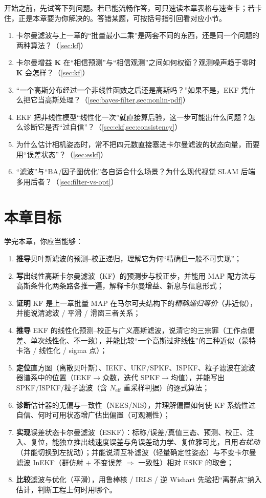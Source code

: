 \begin{practice}[前置自测]
开始之前，先试答下列问题。若已能流畅作答，可只速读本章表格与速查卡；若卡住，正是本章要为你解决的。\;答错某题，可按括号指引回看对应小节。
\begin{enumerate}
  \item 卡尔曼滤波与上一章的“批量最小二乘”是两套不同的东西，还是同一个问题的两种算法？（\cref{sec:kf}）
  \item 卡尔曼增益 $\mathbf{K}$ 在“相信预测”与“相信观测”之间如何权衡？观测噪声趋于零时 $\mathbf{K}$ 会怎样？（\cref{sec:kf}）
  \item “一个高斯分布经过一个非线性函数之后还是高斯吗？”如果不是，EKF 凭什么把它当高斯处理？（\cref{sec:bayes-filter,sec:nonlin-pdf}）
  \item EKF 把非线性模型“线性化一次”就直接算后验，这一步可能出什么问题？怎么诊断它是否“过自信”？（\cref{sec:ekf,sec:consistency}）
  \item 为什么估计相机姿态时，常不把四元数直接塞进卡尔曼滤波的状态向量，而要用“误差状态”？（\cref{sec:eskf}）
  \item “滤波”与“BA/因子图优化”各自适合什么场景？为什么现代视觉 SLAM 后端多用后者？（\cref{sec:filter-vs-opt}）
\end{enumerate}
\end{practice}

\section*{本章目标}
学完本章，你应当能够：
\begin{enumerate}
  \item \textbf{推导}贝叶斯滤波的预测–校正递归，理解它为何“精确但一般不可实现”；
  \item \textbf{写出}线性高斯卡尔曼滤波（KF）的预测步与校正步，并能用 MAP 配方法与高斯条件化两条路各推一遍，解释卡尔曼增益、新息与信息形式；
  \item \textbf{证明} KF 是上一章批量 MAP 在马尔可夫结构下的\emph{精确递归等价}（非近似），并能说清滤波 / 平滑 / 滑窗三者关系；
  \item \textbf{推导} EKF 的线性化预测–校正与广义高斯滤波，说清它的三宗罪（工作点偏差、单次线性化、不一致），并能比较“一个高斯过非线性”的三种近似（蒙特卡洛 / 线性化 / sigma 点）；
  \item \textbf{定位}直方图（离散贝叶斯）、IEKF、UKF/SPKF、ISPKF、粒子滤波在滤波器谱系中的位置（IEKF$\to$众数，迭代 SPKF$\to$均值），并能写出 SPKF/ISPKF/粒子滤波（含 $N_{\text{eff}}$ 重采样判据）的逐式算法；
  \item \textbf{诊断}估计器的无偏与一致性（NEES/NIS），并理解偏置如何使 KF 系统性过自信、何时可用状态增广估出偏置（可观测性）；
  \item \textbf{实现}误差状态卡尔曼滤波（ESKF）：标称/误差/真值三态、预测、校正、注入、复位，能独立推出线速度误差与角误差动力学、复位雅可比，且用\emph{右扰动}（并能切换到左扰动）；并能说清互补滤波（轻量确定性姿态）与不变卡尔曼滤波 InEKF（群仿射 $+$ 不变误差 $\Rightarrow$ 一致性）相对 ESKF 的取舍；
  \item \textbf{比较}滤波与优化（平滑），用鲁棒核 / IRLS / 逆 Wishart 先验把“离群点”纳入估计，判断工程上何时用哪个。
\end{enumerate}

